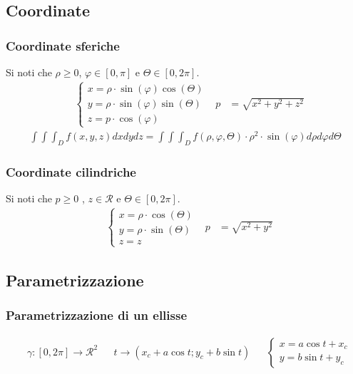 \documentclass[a4paper]{article}
\begin{document}
			\newpage
	\subsection{Coordinate}
	\subsubsection{Coordinate sferiche}
	Si noti che $\rho \ge 0$, $\varphi \in [0,\pi]$ e $\varTheta \in [0,2\pi]$.
	\begin{align*}
		&\begin{cases}
			x = \rho \cdot \sin(\varphi)\cos(\varTheta)\\
			y = \rho \cdot \sin(\varphi)\sin(\varTheta)\\
			z = p \cdot \cos(\varphi)
		\end{cases}	&	p &= \sqrt{x^2+y^2+z^2}
	\end{align*}
	\begin{align*}
				\int \int \int_{D}f(x,y,z)dxdydz = \int \int \int_D f(\rho,\varphi,\varTheta) \cdot \rho^2 \cdot \sin(\varphi) d\rho d\varphi d\varTheta
	\end{align*}
	\subsubsection{Coordinate cilindriche}
	Si noti che $p \ge 0$ , $z \in \mathcal{R}$ e $\varTheta \in [0,2\pi]$.
	\begin{align*}
		&\begin{cases}
		x = \rho \cdot \cos(\varTheta)\\
		y = \rho \cdot \sin(\varTheta)\\
		z=z
		\end{cases}	&	p &= \sqrt{x^2+y^2}
	\end{align*}
	
	\subsection{Parametrizzazione}
	\subsubsection{Parametrizzazione di un ellisse}
	\begin{align*}
		&\gamma: [0,2\pi] \to \mathcal{R}^2	&	&t\to (x_c + a \cos t ; y_c + b \sin t)	&	&
		\begin{cases}
		x = a\cos t + x_c\\
		y = b \sin t + y_c
		\end{cases}
	\end{align*}
\end{document}
